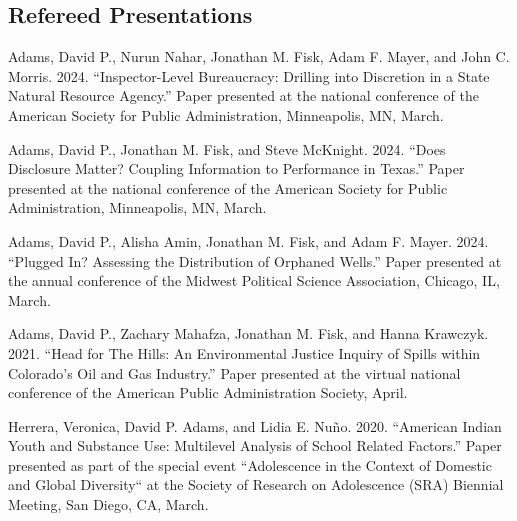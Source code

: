 \documentclass[12pt,letterpaper]{article}
\renewenvironment{itemize}{
  \begin{list}{}{
    \setlength{\leftmargin}{1.5em}
    \setlength{\itemsep}{0.25em}
    \setlength{\parskip}{0pt}
    \setlength{\parsep}{0.25em}
  }
}{
  \end{list}
}
\begin{document}

\subsection*{Refereed Presentations}
	\begin{itemize}\leftmargin=2pt\itemindent=-15pt\leftmargin=2pt\itemindent=-15pt

      \item Adams, David P., Nurun Nahar, Jonathan M. Fisk, Adam F. Mayer, and John C. Morris. 2024. ``Inspector-Level Bureaucracy: Drilling into Discretion in a State Natural Resource Agency.'' Paper presented at the national conference of the American Society for Public Administration, Minneapolis, MN, March.
      
      \item Adams, David P., Jonathan M. Fisk, and Steve McKnight. 2024. ``Does Disclosure Matter? Coupling Information to Performance in Texas.'' Paper presented at the national conference of the American Society for Public Administration, Minneapolis, MN, March.
      
      \item Adams, David P., Alisha Amin, Jonathan M. Fisk, and Adam F. Mayer. 2024. ``Plugged In? Assessing the Distribution of Orphaned Wells.'' Paper presented at the annual conference of the Midwest Political Science Association, Chicago, IL, March.
      
      \item Adams, David P., Zachary Mahafza, Jonathan M. Fisk, and Hanna Krawczyk. 2021. ``Head for The Hills: An Environmental Justice Inquiry of Spills within Colorado's Oil and Gas Industry.'' Paper presented at the virtual national conference of the American Public Administration Society, April.
      
      \item Herrera, Veronica, David P. Adams, and Lidia E. Nuño. 2020. ``American Indian Youth and Substance Use: Multilevel Analysis of School Related Factors.'' Paper presented as part of the special event ``Adolescence in the Context of Domestic and Global Diversity`` at the Society of Research on Adolescence (SRA) Biennial Meeting, San Diego, CA, March.
      

\end{itemize}
\end{document}
